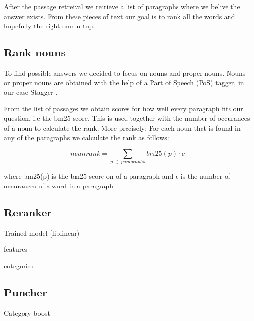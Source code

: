 After the passage retreival we retrieve a list of paragraphs where we belive the answer exists. 
From these pieces of text our goal is to rank all the words and hopefully the right one in top.

\subsection{Rank nouns}

To find possible answers we decided to focus on nouns and proper nouns. 
Nouns or proper nouns are obtained with the help of a Part of Speech (PoS) tagger, in our case Stagger \cite{stagger}.

From the list of passages we obtain scores for how well every paragraph fits our question, i.e the bm25 score. 
This is used together with the number of occurances of a noun to calculate the rank.
More precisely: For each noun that is found in any of the paragraphs we calculate the rank as follows:

\[ nounrank = \sum_{p\:\in\:paragraphs}bm25(p) \cdot c \]

where bm25(p) is the bm25 score on of a paragraph and c is the number of occurances of a word in a paragraph

\subsection{Reranker}

Trained model (liblinear)

features

categories

\subsection{Puncher}

Category boost